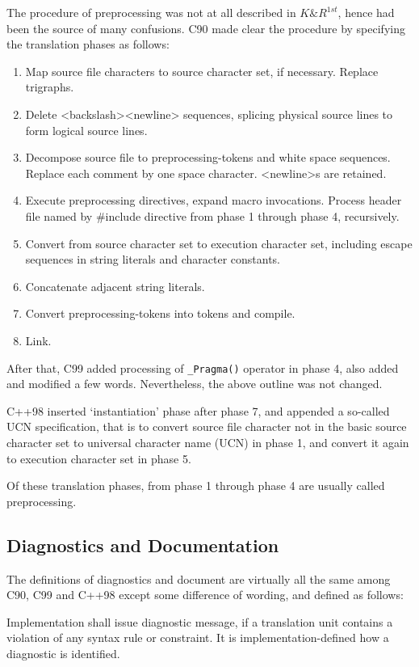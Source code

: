 \documentclass[twocolumn]{article}
\begin{document}
The procedure of preprocessing was not at all described in $K\&R^{1st}$, hence had been the source of many confusions.  C90 made clear the procedure by specifying the translation phases as follows:

\begin{enumerate}
\item Map source file characters to source character set, if necessary.  Replace trigraphs.
\item Delete <backslash><newline> sequences, splicing physical source lines to form logical source lines.
\item Decompose source file to preprocessing-tokens and white space sequences.  Replace each comment by one space character.  <newline>s are retained.
\item Execute preprocessing directives, expand macro invocations.  Process header file named by \#include directive from phase 1 through phase 4, recursively.
\item Convert from source character set to execution character set, including escape sequences in string literals and character constants.
\item Concatenate adjacent string literals.
\item Convert preprocessing-tokens into tokens and compile.
\item Link.
\end{enumerate}

After that, C99 added processing of \verb|_Pragma()| operator in phase 4, also added and modified a few words.  Nevertheless, the above outline was not changed.

C++98 inserted `instantiation' phase after phase 7, and appended a so-called UCN specification, that is to convert source file character not in the basic source character set to universal character name (UCN) in phase 1, and convert it again to execution character set in phase 5.

Of these translation phases, from phase 1 through phase 4 are usually called preprocessing.

\subsection{Diagnostics and Documentation}

The definitions of diagnostics and document are virtually all the same among C90, C99 and C++98 except some difference of wording, and defined as follows:

Implementation shall issue diagnostic message, if a translation unit contains a violation of any
\newpage
\vspace*{12pt}
\noindent
syntax rule or constraint. 
It is implementation-defined how a diagnostic is identified.
\end{document}
